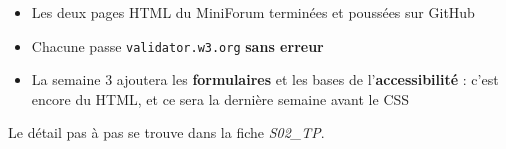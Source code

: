 \documentclass[a4paper,11pt]{article}
\begin{document}
\vspace{8pt}
\begin{tcolorbox}[attention, title={Pour la semaine 3}]
\begin{itemize}
  \item Les deux pages HTML du MiniForum terminées et poussées sur GitHub
  \item Chacune passe \texttt{validator.w3.org} \textbf{sans erreur}
  \item La semaine 3 ajoutera les \textbf{formulaires} et les bases de l'\textbf{accessibilité} : c'est encore du HTML, et ce sera la dernière semaine avant le CSS
\end{itemize}
Le détail pas à pas se trouve dans la fiche \textit{S02\_TP}.
\end{tcolorbox}
\end{document}
